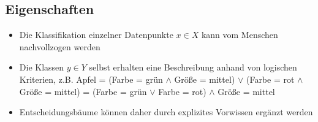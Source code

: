 \documentclass{report}
\begin{document}
\subsection{Eigenschaften}

\begin{itemize}
  \item Die Klassifikation einzelner Datenpunkte $x\in X$ kann vom Menschen nachvollzogen werden
  \item Die Klassen $y\in Y$ selbst erhalten eine Beschreibung anhand von logischen Kriterien, z.B.
  \subitem Apfel = (Farbe = grün $\land$ Größe = mittel) $\lor$ (Farbe = rot $\land$ Größe = mittel)
  = (Farbe = grün $\lor$ Farbe = rot) $\land$ Größe = mittel
  \item Entscheidungsbäume können daher durch explizites Vorwissen ergänzt werden
\end{itemize}
\end{document}
